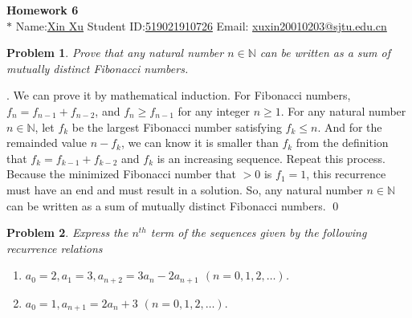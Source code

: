 \documentclass[12pt]{article}
\date{Feb 14, 2012}
\newtheorem{hw}{Problem}
\newenvironment{sol}
  {\par\vspace{3mm}\noindent{\it Solution}.}
  {\qed}
\begin{document}
\begin{center}
{\LARGE\bf Homework 6}\\
\vspace{2mm}
\footnotesize{$*$ Name:\underline{Xin Xu}  \quad Student ID:\underline{519021910726} \quad Email: \underline{xuxin20010203@sjtu.edu.cn}}
\vspace{2mm}
\end{center}

\begin{hw}
Prove that any natural number $n\in\mathbb{N}$ can be written as a sum of mutually distinct Fibonacci numbers.
\end{hw}

\begin{sol}
    We can prove it by mathematical induction. For Fibonacci numbers, $f_n=f_{n-1}+f_{n-2}$, and $f_n\geqslant f_{n-1}$ for any integer $n\geqslant 1$. For any natural number $n\in \mathbb{N}$, let $f_k$
    be the largest Fibonacci number satisfying $f_k\leqslant n$. And for the remainded value $n-f_k$, we can know it is smaller than $f_k$ from the definition that $f_k=f_{k-1}+f_{k-2}$ and $f_k$ is an increasing sequence. Repeat this process. Because the minimized Fibonacci number that $>0$ is $f_1=1$, this recurrence must have an end and must result in a solution.
    So, any natural number $n\in\mathbb{N}$ can be written as a sum of mutually distinct Fibonacci numbers.
\end{sol}
    


\begin{hw}
Express the $n^{th}$ term of the sequences given by the following recurrence relations

\begin{enumerate}
 \item $a_0=2, a_1=3, a_{n+2}=3a_n - 2a_{n+1} $ $(n=0,1,2,\ldots)$.
 \item $a_0=1, a_{n+1}=2a_n+3$ $(n=0,1,2,\ldots).$
\end{enumerate}
\end{hw}
\end{document}
